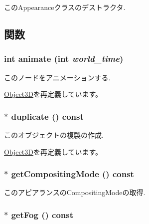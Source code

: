 このAppearanceクラスのデストラクタ. 

\subsection{関数}
\hypertarget{classm3g_1_1Appearance_8aad1ceab4c2a03609c8a42324ce484d}{
\subsubsection[{animate}]{\setlength{\rightskip}{0pt plus 5cm}int animate (int {\em world\_\-time})}}
\label{classm3g_1_1Appearance_8aad1ceab4c2a03609c8a42324ce484d}


このノードをアニメーションする. 

\hyperlink{classm3g_1_1Object3D_8aad1ceab4c2a03609c8a42324ce484d}{Object3D}を再定義しています。\hypertarget{classm3g_1_1Appearance_ceaab703eb45cba7cf8705bc3a087127}{
\subsubsection[{duplicate}]{ $\ast$ duplicate () const}}
\label{classm3g_1_1Appearance_ceaab703eb45cba7cf8705bc3a087127}


このオブジェクトの複製の作成. 

\hyperlink{classm3g_1_1Object3D_a25110dac934f867b83b73ad4741a0f4}{Object3D}を再定義しています。\hypertarget{classm3g_1_1Appearance_e4045934febb56891c15e14486b239a8}{
\subsubsection[{getCompositingMode}]{ $\ast$ getCompositingMode () const}}
\label{classm3g_1_1Appearance_e4045934febb56891c15e14486b239a8}


このアピアランスのCompositingModeの取得. \hypertarget{classm3g_1_1Appearance_93143a921b998ff69576147a59eb44d4}{
\subsubsection[{getFog}]{ $\ast$ getFog () const}}
\label{classm3g_1_1Appearance_93143a921b998ff69576147a59eb44d4}


